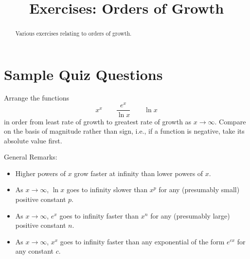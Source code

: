 \documentclass{ximera}
\title{Exercises: Orders of Growth}
\begin{document}
\begin{abstract}
Various exercises relating to orders of growth.
\end{abstract}
\maketitle

\section*{Sample Quiz Questions}

\begin{question}%

Arrange the functions 
\[ x^{x} \qquad \frac{e^{x}}{\ln{x}} \qquad \ln{x} \]
in order from least rate of growth to greatest rate of growth as \(x \rightarrow \infty\). Compare on the basis of magnitude rather than sign, i.e., if a function is negative, take its absolute value first.
\begin{multiplechoice}
\end{multiplechoice}
\begin{feedback}
General Remarks:
\begin{itemize} \item Higher powers of \(x\) grow faster at infinity than lower powers of \(x\).
\item As \(x \rightarrow \infty\), \(\ln x\) goes to infinity slower than \(x^p\) for any (presumably small) positive constant \(p\).
\item As \(x \rightarrow \infty\), \(e^x\) goes to infinity faster than \(x^n\) for any (presumably large) positive constant \(n\).
\item As \(x \rightarrow \infty\), \(x^x\) goes to infinity faster than any exponential of the form \(e^{cx}\) for any constant \(c\).
\end{itemize}
\end{feedback}

\end{question}
\end{document}
